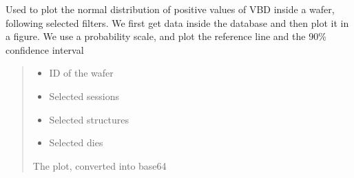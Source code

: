 \documentclass[letterpaper,10pt,english]{sphinxmanual}
\begin{document}
\begin{fulllineitems}
\label{\detokenize{normal_plots:normal_plots.VBD_normal_distrib_pos}}
\pysigstartsignatures
{}
\pysigstopsignatures
\sphinxAtStartPar
Used to plot the normal distribution of positive values of VBD inside a wafer, following selected filters.
We first get data inside the database and then plot it in a figure. We use a probability scale, and plot the reference line and the 90\% confidence interval
\begin{quote}\begin{description}
\begin{itemize}
\item {} 
\sphinxAtStartPar
{} \textendash{} ID of the wafer

\item {} 
\sphinxAtStartPar
{} \textendash{} Selected sessions

\item {} 
\sphinxAtStartPar
{} \textendash{} Selected structures

\item {} 
\sphinxAtStartPar
{} \textendash{} Selected dies

\end{itemize}

\sphinxAtStartPar
The plot, converted into base64

\end{description}\end{quote}

\end{fulllineitems}

\end{document}
